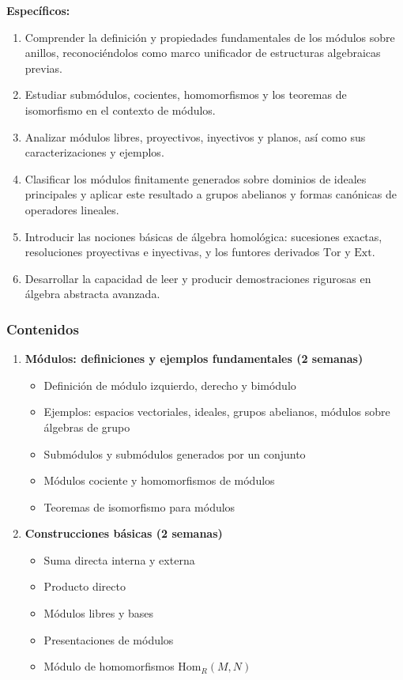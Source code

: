 \begin{refsection}
\textbf{Específicos:}

\begin{enumerate}
        \item Comprender la definición y propiedades fundamentales de los módulos sobre anillos, reconociéndolos como marco unificador de estructuras algebraicas previas.
    \item Estudiar submódulos, cocientes, homomorfismos y los teoremas de isomorfismo en el contexto de módulos.
    \item Analizar módulos libres, proyectivos, inyectivos y planos, así como sus caracterizaciones y ejemplos.
    \item Clasificar los módulos finitamente generados sobre dominios de ideales principales y aplicar este resultado a grupos abelianos y formas canónicas de operadores lineales.
    \item Introducir las nociones básicas de álgebra homológica: sucesiones exactas, resoluciones proyectivas e inyectivas, y los funtores derivados $\mathrm{Tor}$ y $\mathrm{Ext}$.
    \item Desarrollar la capacidad de leer y producir demostraciones rigurosas en álgebra abstracta avanzada.
\end{enumerate}


\subsubsection*{Contenidos}

\begin{enumerate}
    \item \textbf{Módulos: definiciones y ejemplos fundamentales (2 semanas)}
    \begin{itemize}
        \item Definición de módulo izquierdo, derecho y bimódulo
        \item Ejemplos: espacios vectoriales, ideales, grupos abelianos, módulos sobre álgebras de grupo
        \item Submódulos y submódulos generados por un conjunto
        \item Módulos cociente y homomorfismos de módulos
        \item Teoremas de isomorfismo para módulos
    \end{itemize}

    \item \textbf{Construcciones básicas (2 semanas)}
    \begin{itemize}
        \item Suma directa interna y externa
        \item Producto directo
        \item Módulos libres y bases
        \item Presentaciones de módulos
        \item Módulo de homomorfismos $\mathrm{Hom}_R(M,N)$
    \end{itemize}


\end{enumerate}
\end{refsection}
